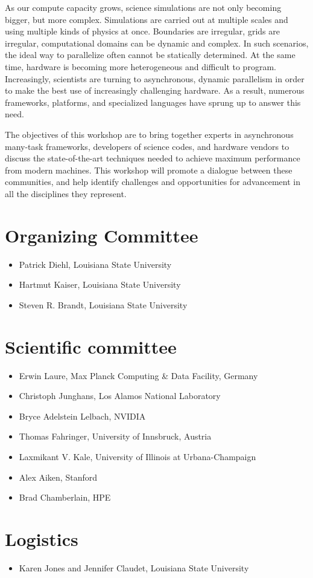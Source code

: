 As our compute capacity grows, science simulations are not only becoming bigger, but more complex. Simulations are carried out at multiple scales and using multiple kinds of physics at once. Boundaries are irregular, grids are irregular, computational domains can be dynamic and complex. In such scenarios, the ideal way to parallelize often cannot be statically determined. At the same time, hardware is becoming more heterogeneous and difficult to program. Increasingly, scientists are turning to asynchronous, dynamic parallelism in order to make the best use of increasingly challenging hardware. As a result, numerous frameworks, platforms, and specialized languages have sprung up to answer this need.

The objectives of this workshop are to bring together experts in asynchronous many-task frameworks, developers of science codes, and hardware vendors to discuss the state-of-the-art techniques needed to achieve maximum performance from modern machines. This workshop will promote a dialogue between these communities, and help identify challenges and opportunities for advancement in all the disciplines they represent.

\section*{Organizing Committee}
\begin{itemize}
\item Patrick Diehl, Louisiana State University
\item Hartmut Kaiser, Louisiana State University
\item Steven R. Brandt, Louisiana State University
\end{itemize}

\section*{Scientific committee}
\begin{itemize}
\item Erwin Laure, Max Planck Computing \& Data Facility, Germany
\item Christoph Junghans, Los Alamos National Laboratory
\item Bryce Adelstein Lelbach, NVIDIA
\item Thomas Fahringer, University of Innsbruck, Austria
\item Laxmikant V. Kale,  University of Illinois at Urbana-Champaign
\item Alex Aiken, Stanford
\item Brad Chamberlain, HPE
\end{itemize}

\section*{Logistics}
\begin{itemize}
\item Karen Jones and Jennifer Claudet, Louisiana State University
\end{itemize}
